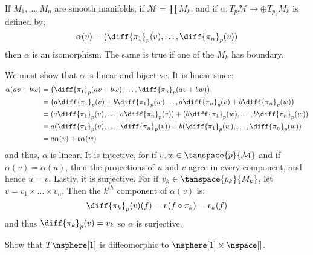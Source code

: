         \begin{problem}
            If $M_{1},\dots,M_{n}$ are smooth manifolds, if
            $\mathcal{M}=\prod{M}_{k}$, and if
            $\alpha:T_{p}\mathcal{M}\rightarrow\oplus{T}_{p_{k}}M_{k}$
            is defined by;
            \begin{equation}
                \alpha(v)=(\diff{\pi_{1}}_{p}(v),\dots,
                            \diff{\pi_{n}}_{p}(v))
            \end{equation}
            then $\alpha$ is an isomorphism. The same is true if one of the
            $M_{k}$ has boundary.
        \end{problem}
        \begin{solution}
            We must show that $\alpha$ is linear and bijective. It is linear
            since:
            \begin{align}
                \alpha(av+bw)&=
                    \big(\diff{\pi_{1}}_{p}(av+bw),\dots,
                        \diff{\pi_{n}}_{p}(av+bw)\big)\\
                    &=\big(a\diff{\pi_{1}}_{p}(v)+b\diff{\pi_{1}}_{p}(w)
                        \dots,a\diff{\pi_{n}}_{p}(v)+b\diff{\pi_{n}}_{p}(w)
                    \big)\\
                    &=(a\diff{\pi_{1}}_{p}(v),\dots,a\diff{\pi_{n}}_{p}(v))
                    +(b\diff{\pi_{1}}_{p}(w),\dots,b\diff{\pi_{n}}_{p}(w))\\
                    &=a(\diff{\pi_{1}}_{p}(v),\dots,\diff{\pi_{n}}_{p}(v))+
                    b(\diff{\pi_{1}}_{p}(w),\dots,\diff{\pi_{n}}_{p}(w))\\
                    &=a\alpha(v)+b\alpha(w)
            \end{align}
            and thus, $\alpha$ is linear. It is injective, for if
            $v,w\in\tanspace{p}{\mathcal{M}}$ and if $\alpha(v)=\alpha(u)$,
            then the projections of $u$ and $v$ agree in every component,
            and hence $u=v$. Lastly, it is surjective. For if
            $v_{k}\in\tanspace{p_{k}}{M_{k}}$, let
            $v=v_{1}\times\dots\times{v}_{n}$. Then the $k^{th}$ component
            of $\alpha(v)$ is:
            \begin{equation}
                \diff{\pi_{k}}_{p}(v)(f)=v(f\circ\pi_{k})=v_{k}(f)
            \end{equation}
            and thus $\diff{\pi_{k}}_{p}(v)=v_{k}$ so $\alpha$ is
            surjective.
        \end{solution}
        \begin{problem}
            Show that $T\nsphere[1]$ is diffeomorphic to
            $\nsphere[1]\times\nspace[]$.
        \end{problem}
